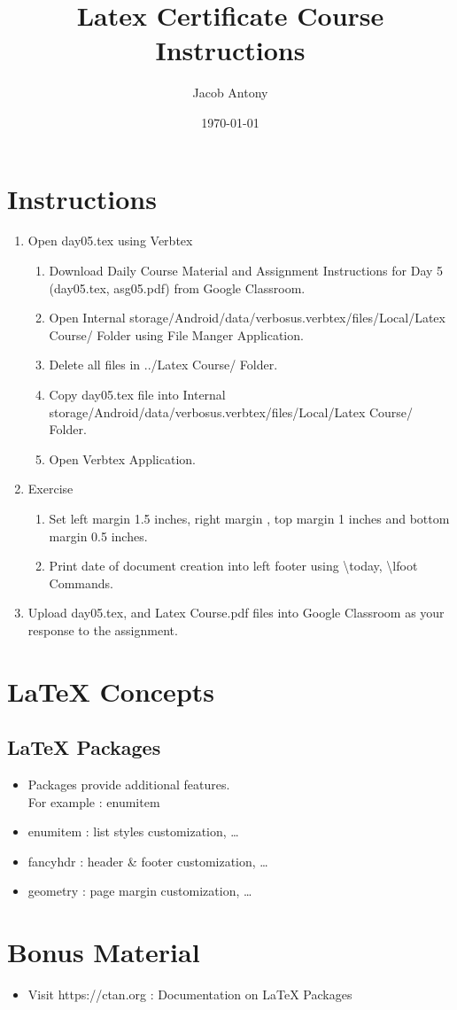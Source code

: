 \documentclass{article}
\title{Latex Certificate Course Instructions}
\author{Jacob Antony}
\date{\today}
\begin{document}
\maketitle

\section*{Instructions}
\begin{enumerate}
	\item Open day05.tex using Verbtex
	\begin{enumerate}
		\item Download Daily Course Material and Assignment Instructions for Day 5 (day05.tex, asg05.pdf) from Google Classroom.
		\item Open Internal storage/Android/data/verbosus.verbtex/files/Local/Latex Course/ Folder using File Manger Application.
		\item Delete all files in ../Latex Course/ Folder.
		\item Copy day05.tex file into Internal storage/Android/data/verbosus.verbtex/files/Local/Latex Course/  Folder.
		\item Open Verbtex Application.
	\end{enumerate}
	\item Exercise
	\begin{enumerate}
		\item Set left margin 1.5 inches, right margin , top margin 1 inches and bottom margin 0.5 inches.
		\item Print date of document creation into left footer using \textbackslash{}today, \textbackslash{}lfoot Commands.
	\end{enumerate}
	\item Upload day05.tex, and Latex Course.pdf files into Google Classroom as your response to the assignment.
\end{enumerate}

\section{\LaTeX{} Concepts}

\subsection{\LaTeX{} Packages}
\begin{itemize}
	\item Packages provide additional features. \\ For example : enumitem
	\item enumitem : list styles customization, \dots
	\item fancyhdr : header \& footer customization, \dots
	\item geometry : page margin customization, \dots
\end{itemize}

\section*{Bonus Material}
\begin{itemize}
	\item Visit https://ctan.org : Documentation on \LaTeX{} Packages
\end{itemize}
\end{document}
